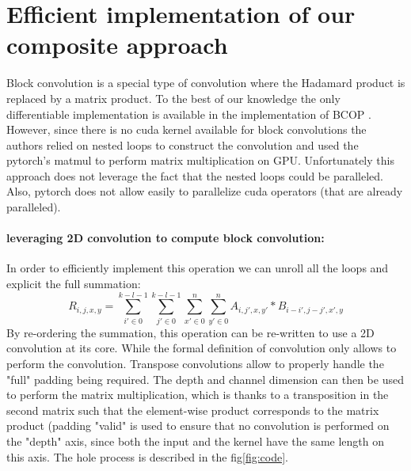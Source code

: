 \section{Efficient implementation of our composite approach}

    Block convolution is a special type of convolution where the Hadamard product is replaced by a matrix product. To the best of our knowledge the only differentiable implementation is available in the implementation of BCOP \cite{li_preventing_2019}. However, since there is no cuda kernel available for block convolutions the authors relied on nested loops to construct the convolution and used the pytorch's matmul to perform matrix multiplication on GPU. Unfortunately this approach does not leverage the fact that the nested loops could be paralleled. Also, pytorch does not allow easily to parallelize cuda operators (that are already paralleled).

    \paragraph{leveraging 2D convolution to compute block convolution:}
    In order to efficiently implement this operation we can unroll all the loops and explicit the full summation:
    \[
        R_{i,j,x,y} = \sum_{i' \in 0}^{k-l-1}\sum_{j' \in 0}^{k-l-1}\sum_{x' \in 0}^{n}\sum_{y' \in 0}^{n} A_{i,j',x,y'} * B_{i-i',j-j',x',y}
    \]
    \red{
    \[
        R_{m,n,i,j} = \sum_{k \in 0}^{c-1}\sum_{i' \in 0}^{k-l-1}\sum_{j' \in 0}^{k-l-1} A_{m,k,i',j'} . B_{k,n,i-i',j-j'}
    \]
    }
    By re-ordering the summation, this operation can be re-written to use a 2D convolution at its core. While the formal definition of convolution only allows to perform the convolution. Transpose convolutions allow to properly handle the "full" padding being required. The depth and channel dimension can then be used to perform the matrix multiplication, which is thanks to a transposition in the second matrix such that the element-wise product corresponds to the matrix product (padding "valid" is used to ensure that no convolution is performed on the "depth" axis, since both the input and the kernel have the same length on this axis. The hole process is described in the fig\ref{fig:code}.

